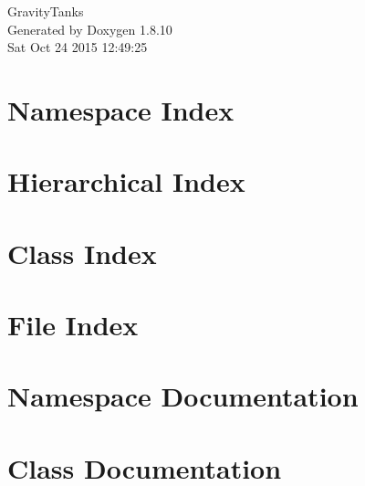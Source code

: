 \documentclass[twoside]{book}
\newcommand{\+}{\discretionary{\mbox{\scriptsize$\hookleftarrow$}}{}{}}
\newcommand{\clearemptydoublepage}{%
  \newpage{\pagestyle{empty}\cleardoublepage}%
}
\begin{document}
\hypersetup{pageanchor=false,
             bookmarks=true,
             bookmarksnumbered=true,
             pdfencoding=unicode
            }
\begin{titlepage}
\vspace*{7cm}
\begin{center}%
{\Large Gravity\+Tanks }\\
\vspace*{1cm}
{\large Generated by Doxygen 1.8.10}\\
\vspace*{0.5cm}
{\small Sat Oct 24 2015 12:49:25}\\
\end{center}
\end{titlepage}
\clearemptydoublepage
\tableofcontents
\clearemptydoublepage
{}
\hypersetup{pageanchor=true}

\chapter{Namespace Index}

\chapter{Hierarchical Index}

\chapter{Class Index}

\chapter{File Index}

\chapter{Namespace Documentation}







\chapter{Class Documentation}















\end{document}
